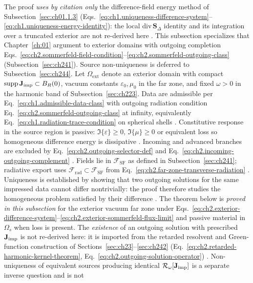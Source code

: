 The proof \emph{uses by citation only} the difference-field energy method of Subsection~\ref{sec:ch01.1.3}
(Eqs.~\eqref{eq:ch1.uniqueness-difference-system}--\eqref{eq:ch1.uniqueness-energy-identity}):
the local div\,$\mathbf{S}_\Delta$ identity and its integration over a truncated exterior are not re-derived here
\cite{stratton1941,harrington2001}. This subsection specializes that Chapter~\ref{ch:01} argument to exterior domains with outgoing completion
Eqs.~\eqref{eq:ch2.sommerfeld-field-condition}--\eqref{eq:ch2.sommerfeld-outgoing-class}
(Subsection~\ref{sec:ch241}). Source non-uniqueness is deferred to Subsection~\ref{sec:ch244}. Let \(\Omega_{\mathrm{ext}}\) denote an exterior domain with compact
\(\operatorname{supp}\mathbf{J}_{\mathrm{imp}}\subset B_R(0)\), vacuum constants \(\varepsilon_0,\mu_0\)
in the far zone, and fixed \(\omega>0\) in the harmonic band of
Subsection~\ref{sec:ch223}. Data are admissible per
Eq.~\eqref{eq:ch1.admissible-data-class} with outgoing radiation condition
Eq.~\eqref{eq:ch2.sommerfeld-outgoing-class} at infinity, equivalently
Eq.~\eqref{eq:ch1.radiation-trace-condition} on spherical shells
\cite{stratton1941}. Constitutive response in the source region is passive:
\(\Im\{\varepsilon\}\ge 0\), \(\Im\{\mu\}\ge 0\) or equivalent loss so homogeneous
difference energy is dissipative \cite{stratton1941}. Incoming and advanced branches
are excluded by Eq.~\eqref{eq:ch2.outgoing-selector-def} and
Eq.~\eqref{eq:ch2.incoming-outgoing-complement} \cite{harrington2001}. Fields lie in
\(\mathcal{F}_{\mathrm{SF}}\) as defined in Subsection~\ref{sec:ch241}; radiative
export uses \(\mathcal{F}_{\mathrm{rad}}\subset\mathcal{F}_{\mathrm{SF}}\) from
Eq.~\eqref{eq:ch2.far-zone-transverse-radiation} \cite{stratton1941}.
Uniqueness is established by showing that two outgoing solutions for the same impressed data
cannot differ nontrivially: the proof therefore studies the homogeneous problem satisfied by
their difference \cite{stratton1941}.
The theorem below is \emph{proved in this subsection} for the exterior vacuum far zone under
Eqs.~\eqref{eq:ch2.exterior-difference-system}--\eqref{eq:ch2.exterior-sommerfeld-flux-limit} and passive material in
$\Omega_s$ when loss is present.
The \emph{existence} of an outgoing solution with prescribed $\mathbf{J}_{\mathrm{imp}}$ is not re-derived here: it is imported from the retarded
resolvent and Green-function construction of Sections~\ref{sec:ch23}--\ref{sec:ch242}
(Eq.~\eqref{eq:ch2.retarded-harmonic-kernel-theorem}, Eq.~\eqref{eq:ch2.outgoing-solution-operator})
\cite{stratton1941,harrington2001}.
Non-uniqueness of equivalent sources producing identical $\mathcal{R}_\omega[\mathbf{J}_{\mathrm{imp}}]$ is a separate inverse question and is not
